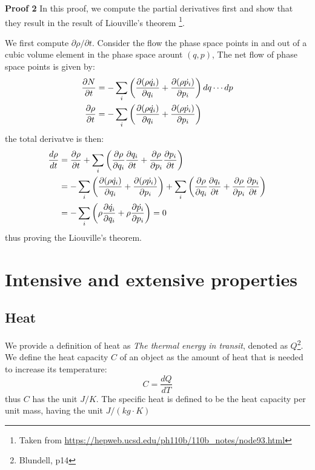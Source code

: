 \documentclass{article}
\begin{document}
\textbf{Proof 2} In this proof, we compute the partial derivatives first and show that they result in the result of Liouville's theorem
\footnote{Taken from \url{https://hepweb.ucsd.edu/ph110b/110b_notes/node93.html}}.

We first compute $\partial \rho / \partial t$. Consider the flow the phase space points in and out of a cubic volume element 
in the phase space arount $(q,p)$, The net flow of phase space points is given by:
\begin{align}
    \frac{\partial N}{\partial t} 
    &= -\sum_i \left( \frac{\partial (\rho \dot{q_i})}{\partial q_i} + \frac{\partial (\rho \dot{p_i})}{\partial p_i} \right) dq \cdots dp \notag \\
    \frac{\partial \rho}{\partial t} 
    &= -\sum_i \left( \frac{\partial (\rho \dot{q_i})}{\partial q_i} + \frac{\partial (\rho \dot{p_i})}{\partial p_i} \right)
\end{align}
the total derivatve is then:
\begin{align}
    \frac{d\rho}{dt} &= \frac{\partial \rho}{\partial t}
    + \sum_i \left( \frac{\partial \rho}{\partial q_i}\frac{\partial q_i}{\partial t} + \frac{\partial \rho}{\partial p_i}\frac{\partial p_i}{\partial t} \right) \notag \\
    &= -\sum_i \left( \frac{\partial (\rho \dot{q_i})}{\partial q_i} + \frac{\partial (\rho \dot{p_i})}{\partial p_i} \right) 
    + \sum_i \left( \frac{\partial \rho}{\partial q_i}\frac{\partial q_i}{\partial t} + \frac{\partial \rho}{\partial p_i}\frac{\partial p_i}{\partial t} \right) \notag \\
    &= - \sum_i \left( \rho\frac{\partial \dot{q_i}}{\partial q_i} + \rho\frac{\partial \dot{p_i}}{\partial p_i}  \right) = 0
\end{align}
thus proving the Liouville's theorem.

\pagebreak
\section{Intensive and extensive properties}

\subsection{Heat}
We provide a definition of heat as \emph{The thermal energy in transit}, denoted as $Q$\footnote{Blundell, p14}. We define the heat capacity
$C$ of an object as the amount of heat that is needed to increase its temperature:
\begin{equation}
    C = \frac{dQ}{dT}
\end{equation}
thus $C$ has the unit $J/K$. The specific heat is defined to be the heat capacity per unit mass, having the unit $J/(kg\cdot K)$
\end{document}

